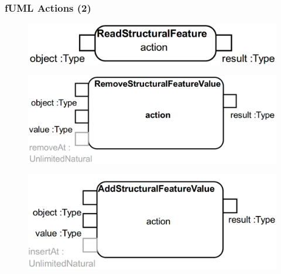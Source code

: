 \documentclass{beamer}
\begin{document}
\begin{frame}
\frametitle{fUML Actions (2)}
\begin{figure}[h!t]
 \centering
 \includegraphics[scale=0.18]{images/fuml-actions/ReadStructuralFeature.png}
\end{figure}
\begin{figure}[h!t]
 \centering
 \includegraphics[scale=0.18]{images/fuml-actions/RemoveStructuralFeatureValue.png}
\end{figure}
\begin{figure}[h!t]
 \centering
 \includegraphics[scale=0.18]{images/fuml-actions/AddStructuralFeatureValue.png}
\end{figure}
\end{frame}
\end{document}
